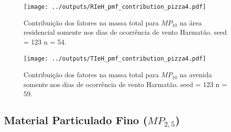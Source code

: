 \begin{landscape}
  \begin{figure}
    \centering
    \begin{minipage}[b]{0.45\linewidth}
      \texttt{[image: ../outputs/RIeH\_pmf\_contribution\_pizza4.pdf]}
      \caption{Contribuição dos fatores na massa total para $MP_{10}$ na área
               residencial somente nos dias de ocorrência de vento Harmatão. seed = 123 n = 54.
               \label{fig:RIeH_contribution4}}
    \end{minipage}%
    \hspace{0.5cm}
    \begin{minipage}[b]{0.45\linewidth}
      
    \end{minipage}
  \end{figure}
\end{landscape}

\begin{landscape}
  \begin{figure}
    \centering
    \begin{minipage}[b]{0.45\linewidth}
      \texttt{[image: ../outputs/TIeH\_pmf\_contribution\_pizza4.pdf]}
      \caption{Contribuição dos fatores na massa total para $MP_{10}$ na avenida
               somente nos dias de ocorrência de vento Harmatão. seed = 123 n = 59.
               \label{fig:TIeH_contribution4}}
    \end{minipage}%
    \hspace{0.5cm}
    \begin{minipage}[b]{0.45\linewidth}
      
    \end{minipage}
  \end{figure}
\end{landscape}

\subsection{Material Particulado Fino ($MP_{2,5}$)}

